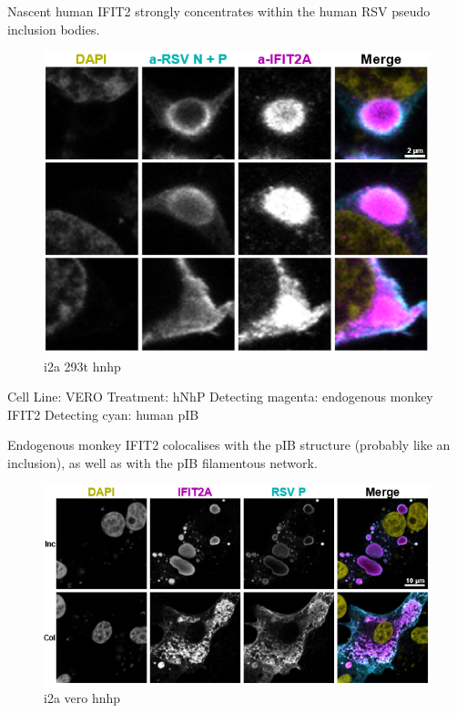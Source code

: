 Nascent human IFIT2 strongly concentrates within the human RSV pseudo inclusion bodies.

\begin{figure}
    \centering
    \includegraphics[width=1\linewidth]{10. Chapter 5/Figs/02. pIB/03. i2a 293t hnhp.png}
    \caption[i2a 293t hnhp]{i2a 293t hnhp}
    \label{fig:i2a 293t hnhp}
\end{figure}

Cell Line: VERO \newline
Treatment: hNhP \newline
Detecting magenta: endogenous monkey IFIT2 \newline
Detecting cyan: human pIB \newline

Endogenous monkey IFIT2 colocalises with the pIB structure (probably like an inclusion), as well as with the pIB filamentous network.

\begin{figure}
    \centering
    \includegraphics[width=1\linewidth]{10. Chapter 5/Figs/02. pIB/04. i2a vero hnhp.png}
    \caption[i2a vero hnhp]{i2a vero hnhp}
    \label{fig:i2a vero hnhp}
\end{figure}

